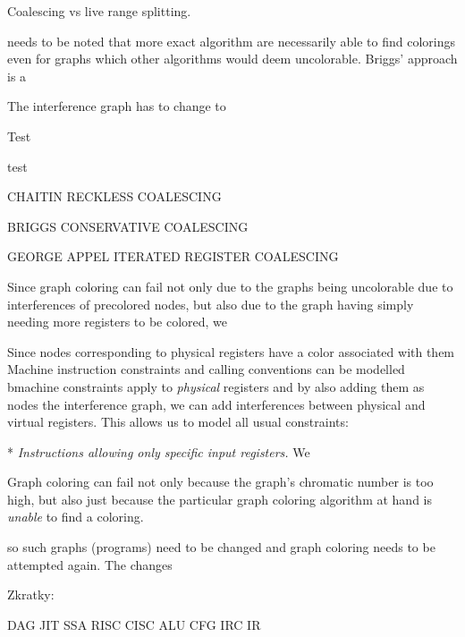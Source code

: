 Coalescing vs live range splitting.



%

needs to be noted that
more exact algorithm are necessarily able to find colorings even for graphs
which other algorithms would deem uncolorable. Briggs' approach is a 

The
interference graph has to change to 

\seccc Test

test




CHAITIN RECKLESS COALESCING

BRIGGS CONSERVATIVE COALESCING

GEORGE APPEL ITERATED REGISTER COALESCING



Since graph coloring can fail not only due to the graphs being uncolorable due
to interferences of precolored nodes, but also due to the graph having simply
needing more registers to be colored, we 

Since nodes corresponding to physical registers have a color associated with
them
Machine instruction constraints and calling conventions can be modelled bmachine constraints apply to {\em physical}
registers and by also adding them as nodes the interference graph, we can add
interferences between physical and virtual registers. This allows us to model
all usual constraints:

\begitems
* {\em Instructions allowing only specific input registers.} We 
\enditems

Graph coloring can fail not only because the graph's chromatic number is too
high, but also just because the particular graph coloring algorithm at hand is
{\em unable} to find a coloring.

so such
graphs (programs) need to be changed and graph coloring needs to be attempted
again. The changes






Zkratky:

DAG
JIT
SSA
RISC
CISC
ALU
CFG
IRC
IR
